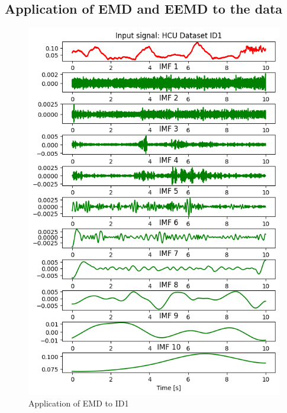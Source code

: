 \documentclass[dvipdfmx]{article}
\begin{document}
\subsection*{Application of EMD and EEMD to the data}
\begin{figure}[H]
\begin{center}
\includegraphics[width=0.8\linewidth]{./img/EMD.png}
\end{center}
\caption{Application of EMD to ID1}
\end{figure}
\end{document}
